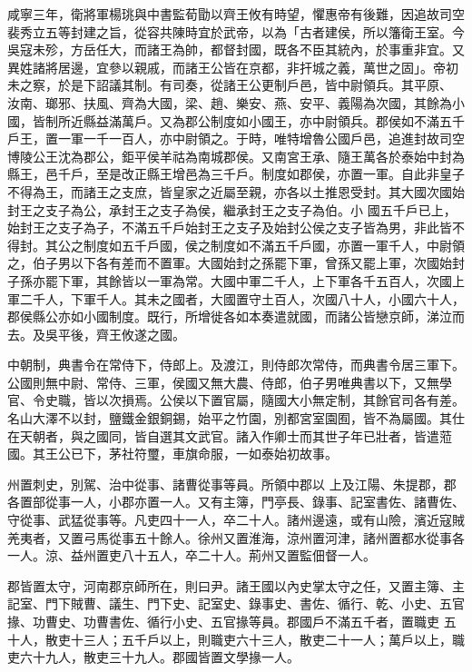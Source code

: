 \begin{pinyinscope}
 咸寧三年，衛將軍楊珧與中書監荀勖以齊王攸有時望，懼惠帝有後難，因追故司空裴秀立五等封建之旨，從容共陳時宜於武帝，以為「古者建侯，所以籓衛王室。今吳寇未殄，方岳任大，而諸王為帥，都督封國，既各不臣其統內，於事重非宜。又異姓諸將居邊，宜參以親戚，而諸王公皆在京都，非扞城之義，萬世之固」。帝初未之察，於是下詔議其制。有司奏，從諸王公更制戶邑，皆中尉領兵。其平原、
 汝南、瑯邪、扶風、齊為大國，梁、趙、樂安、燕、安平、義陽為次國，其餘為小國，皆制所近縣益滿萬戶。又為郡公制度如小國王，亦中尉領兵。郡侯如不滿五千戶王，置一軍一千一百人，亦中尉領之。于時，唯特增魯公國戶邑，追進封故司空博陵公王沈為郡公，鉅平侯羊祜為南城郡侯。又南宮王承、隨王萬各於泰始中封為縣王，邑千戶，至是改正縣王增邑為三千戶。制度如郡侯，亦置一軍。自此非皇子不得為王，而諸王之支庶，皆皇家之近屬至親，亦各以土推恩受封。其大國次國始封王之支子為公，承封王之支子為侯，繼承封王之支子為伯。小
 國五千戶已上，始封王之支子為子，不滿五千戶始封王之支子及始封公侯之支子皆為男，非此皆不得封。其公之制度如五千戶國，侯之制度如不滿五千戶國，亦置一軍千人，中尉領之，伯子男以下各有差而不置軍。大國始封之孫罷下軍，曾孫又罷上軍，次國始封子孫亦罷下軍，其餘皆以一軍為常。大國中軍二千人，上下軍各千五百人，次國上軍二千人，下軍千人。其未之國者，大國置守土百人，次國八十人，小國六十人，郡侯縣公亦如小國制度。既行，所增徙各如本奏遣就國，而諸公皆戀京師，涕泣而去。及吳平後，齊王攸遂之國。



 中朝制，典書令在常侍下，侍郎上。及渡江，則侍郎次常侍，而典書令居三軍下。公國則無中尉、常侍、三軍，侯國又無大農、侍郎，伯子男唯典書以下，又無學官、令史職，皆以次損焉。公侯以下置官屬，隨國大小無定制，其餘官司各有差。名山大澤不以封，鹽鐵金銀銅錫，始平之竹園，別都宮室園囿，皆不為屬國。其仕在天朝者，與之國同，皆自選其文武官。諸入作卿士而其世子年已壯者，皆遣蒞國。其王公已下，茅社符璽，車旗命服，一如泰始初故事。



 州置刺史，別駕、治中從事、諸曹從事等員。所領中郡以
 上及江陽、朱提郡，郡各置部從事一人，小郡亦置一人。又有主簿，門亭長、錄事、記室書佐、諸曹佐、守從事、武猛從事等。凡吏四十一人，卒二十人。諸州邊遠，或有山險，濱近寇賊羌夷者，又置弓馬從事五十餘人。徐州又置淮海，涼州置河津，諸州置都水從事各一人。涼、益州置吏八十五人，卒二十人。荊州又置監佃督一人。



 郡皆置太守，河南郡京師所在，則曰尹。諸王國以內史掌太守之任，又置主簿、主記室、門下賊曹、議生、門下史、記室史、錄事史、書佐、循行、乾、小史、五官掾、功曹史、功曹書佐、循行小史、五官掾等員。郡國戶不滿五千者，置職吏
 五十人，散吏十三人；五千戶以上，則職吏六十三人，散吏二十一人；萬戶以上，職吏六十九人，散吏三十九人。郡國皆置文學掾一人。




\end{pinyinscope}
